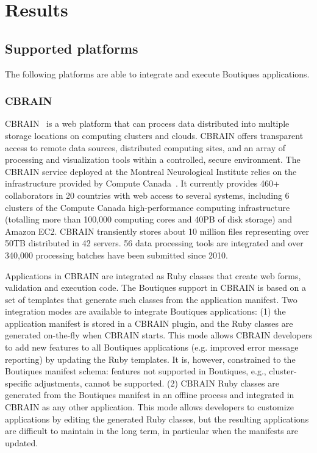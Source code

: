 \documentclass{article}
\begin{document}
\section{Results}

\subsection{Supported platforms}

The following platforms are able to integrate and execute Boutiques
applications. 

\subsubsection{CBRAIN}

CBRAIN~\cite{SHER-14} is a web platform that can process data
distributed into multiple storage locations on computing clusters and
clouds. CBRAIN offers transparent access to remote data sources,
distributed computing sites, and an array of processing and
visualization tools within a controlled, secure environment.  The
CBRAIN service deployed at the Montreal Neurological Institute relies
on the infrastructure provided by Compute Canada~\cite{das2016mni}. It
currently provides 460+ collaborators in 20 countries with web access
to several systems, including 6 clusters of the Compute Canada
high-performance computing infrastructure (totalling more than 100,000
computing cores and 40PB of disk storage) and Amazon EC2. CBRAIN
transiently stores about 10 million files representing over 50TB
distributed in 42 servers. 56 data processing tools are integrated and
over 340,000 processing batches have been submitted since 2010.

Applications in CBRAIN are integrated as Ruby classes that create web
forms, validation and execution code. The Boutiques support in CBRAIN
is based on a set of templates that generate such classes from the
application manifest. Two integration modes are available to integrate
Boutiques applications: (1) the application manifest is stored in a
CBRAIN plugin, and the Ruby classes are generated on-the-fly when
CBRAIN starts. This mode allows CBRAIN developers to add new features
to all Boutiques applications (e.g. improved error message reporting)
by updating the Ruby templates. It is, however, constrained to the
Boutiques manifest schema: features not supported in Boutiques, e.g.,
cluster-specific adjustments, cannot be supported. (2) CBRAIN Ruby
classes are generated from the Boutiques manifest in an offline
process and integrated in CBRAIN as any other application. This mode
allows developers to customize applications by editing the generated
Ruby classes, but the resulting applications are difficult to maintain
in the long term, in particular when the manifests are updated. 
\end{document}
